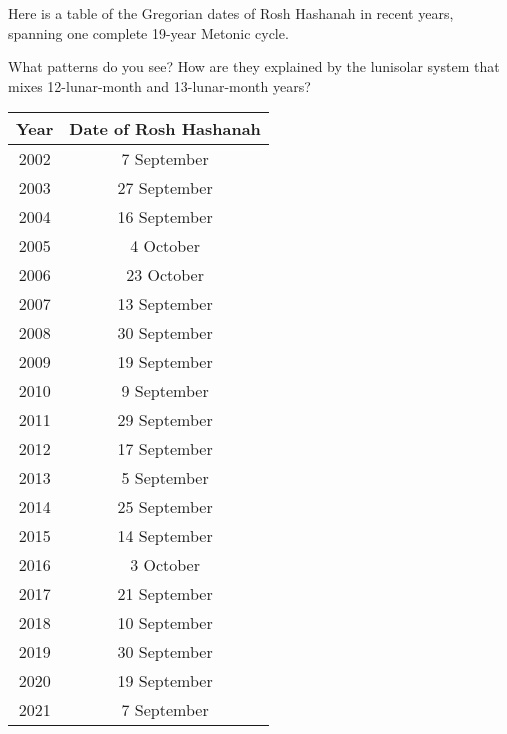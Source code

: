 \documentclass[11pt]{article}
\begin{document}
\begin{minipage}{0.6\textwidth}
	Here is a table of the Gregorian dates of Rosh Hashanah in recent years, spanning one complete 19-year Metonic cycle.
	
	\bigskip
	
	What patterns do you see? How are they explained by the lunisolar system that mixes 12-lunar-month and 13-lunar-month years?
\vspace{2in}

\end{minipage}
\hspace{0.1\textwidth}
\begin{minipage}{0.3\textwidth}
	\begin{center}
		\begin{tabular}{|c|c|}
			\hline
			
			Year & Date of Rosh Hashanah \\ \hline
			2002 & 7 September              \\ \hline
			2003 & 27 September              \\ \hline
			2004 & 16 September              \\ \hline
			2005 & 4 October             \\ \hline
			2006 & 23 October             \\ \hline
			2007 & 13 September              \\ \hline
			2008 & 30 September              \\ \hline
			2009 & 19 September              \\ \hline
			2010 & 9 September          \\ \hline
			2011 & 29 September            \\ \hline
			2012 & 17 September             \\ \hline
			2013 & 5 September             \\ \hline
			2014 & 25 September              \\ \hline
			2015 & 14 September             \\ \hline
			2016 & 3 October             \\ \hline
			2017 & 21 September              \\ \hline
			2018 & 10 September              \\ \hline
			2019 & 30 September              \\ \hline
			2020 & 19 September               \\ \hline
			2021 & 7 September               \\ \hline
		\end{tabular}
	\end{center}
\end{minipage}
\end{document}
